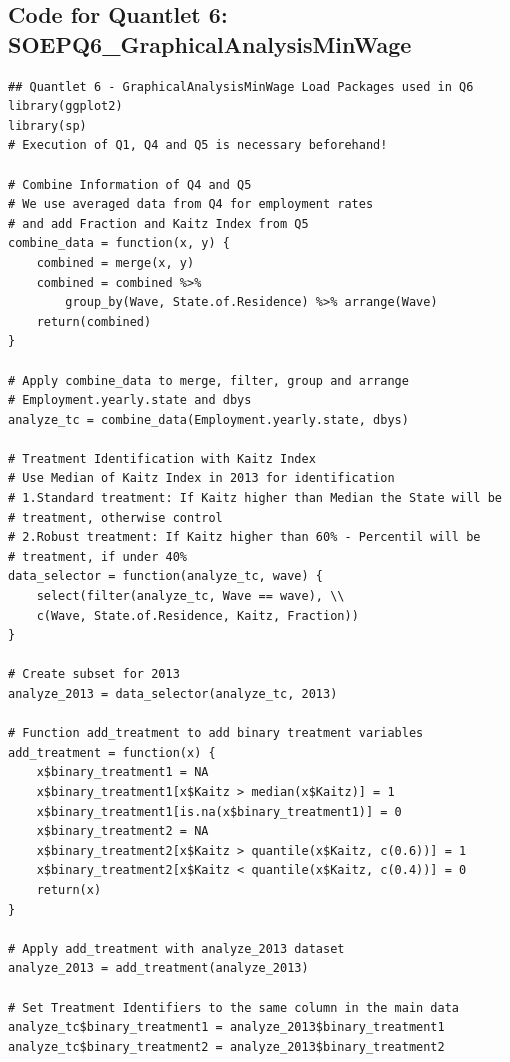 \documentclass[a4paper]{article}
\begin{document}
{\begin{lstlisting}
\end{lstlisting}
\newpage
\subsection{Code for Quantlet 6: SOEPQ6\_GraphicalAnalysisMinWage}
\begin{lstlisting}
## Quantlet 6 - GraphicalAnalysisMinWage Load Packages used in Q6
library(ggplot2)
library(sp)
# Execution of Q1, Q4 and Q5 is necessary beforehand!

# Combine Information of Q4 and Q5 
# We use averaged data from Q4 for employment rates 
# and add Fraction and Kaitz Index from Q5
combine_data = function(x, y) {
    combined = merge(x, y)
    combined = combined %>% 
    	group_by(Wave, State.of.Residence) %>% arrange(Wave)
    return(combined)
}

# Apply combine_data to merge, filter, group and arrange 
# Employment.yearly.state and dbys
analyze_tc = combine_data(Employment.yearly.state, dbys)

# Treatment Identification with Kaitz Index 
# Use Median of Kaitz Index in 2013 for identification
# 1.Standard treatment: If Kaitz higher than Median the State will be 
# treatment, otherwise control
# 2.Robust treatment: If Kaitz higher than 60% - Percentil will be 
# treatment, if under 40%
data_selector = function(analyze_tc, wave) {
    select(filter(analyze_tc, Wave == wave), \\
    c(Wave, State.of.Residence, Kaitz, Fraction))
}

# Create subset for 2013
analyze_2013 = data_selector(analyze_tc, 2013)

# Function add_treatment to add binary treatment variables
add_treatment = function(x) {
    x$binary_treatment1 = NA
    x$binary_treatment1[x$Kaitz > median(x$Kaitz)] = 1
    x$binary_treatment1[is.na(x$binary_treatment1)] = 0
    x$binary_treatment2 = NA
    x$binary_treatment2[x$Kaitz > quantile(x$Kaitz, c(0.6))] = 1
    x$binary_treatment2[x$Kaitz < quantile(x$Kaitz, c(0.4))] = 0
    return(x)
}

# Apply add_treatment with analyze_2013 dataset
analyze_2013 = add_treatment(analyze_2013)

# Set Treatment Identifiers to the same column in the main data
analyze_tc$binary_treatment1 = analyze_2013$binary_treatment1
analyze_tc$binary_treatment2 = analyze_2013$binary_treatment2


\end{lstlisting}}
\end{document}
